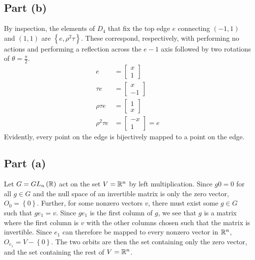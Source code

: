 \documentclass{article}
\begin{document}
\subsection*{Part (b)}
By inspection, the elements of $D_4$ that fix the top edge $e$ connecting $\left(-1, 1\right)$ and $\left(1, 1\right)$ are $\left\{e, \rho^2\tau\right\}$. These correspond, respectively, with performing no actions and performing a reflection across the $e-1$ axis followed by two rotations of $\theta = \frac{\pi}{2}$.
\begin{equation}
    \begin{split}
        e & = \begin{bmatrix} x \\ 1 \end{bmatrix} \\
        \tau e & = \begin{bmatrix} x \\ -1 \end{bmatrix} \\
        \rho\tau e & = \begin{bmatrix} 1 \\ x \end{bmatrix} \\
        \rho^2\tau e & = \begin{bmatrix} -x \\ 1 \end{bmatrix} =  e
    \end{split}
\end{equation}
Evidently, every point on the edge is bijectively mapped to a point on the edge.

\clearpage

\subsection*{Part (a)}
Let $G = GL_n\left(\mathbb{R}\right)$ act on the set $V = \mathbb{R}^n$ by left multiplication. Since $g0 = 0$ for all $g \in G$ and the null space of an invertible matrix is only the zero vector, $O_0 = \left\{0\right\}$. Further, for some nonzero vectors $v$, there must exist some $g \in G$ such that $ge_1 = v$. Since $ge_1$ is the first column of $g$, we see that $g$ is a matrix where the first column is $v$ with the other columns chosen such that the matrix is invertible. Since $e_1$ can therefore be mapped to every nonzero vector in $\mathbb{R}^n$, $O_{e_1} = V - \left\{0\right\}$. The two orbits are then the set containing only the zero vector, and the set containing the rest of $V = \mathbb{R}^n$.
\end{document}
